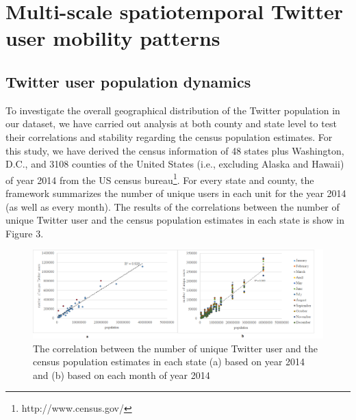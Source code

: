 \documentclass[a4paper, 11pt]{article}
\begin{document}
\section{Multi-scale spatiotemporal Twitter user mobility patterns}

\subsection{Twitter user population dynamics}
To investigate the overall geographical distribution of the Twitter population in our dataset, we have carried out analysis at both county and state level to test their correlations and stability regarding the census population estimates.
For this study, we have derived the census information of 48 states plus Washington, D.C., and 3108 counties of the United States (i.e., excluding Alaska and Hawaii) of year 2014 from the US census bureau\footnote{http://www.census.gov/}.
For every state and county, the framework summarizes the number of unique users in each unit for the year 2014 (as well as every month). 
The results of the correlations between the number of unique Twitter user and the census population estimates in each state is show in Figure 3. 
\newline


\begin{figure}[h]
\centering
\includegraphics[width=1\linewidth]{./figures/test}
\caption{The correlation between the number of unique Twitter user and the census population estimates in each state (a) based on year 2014 and (b) based on each month of year 2014}
\label{fig:Arch}
\end{figure}
\FloatBarrier
\end{document}
